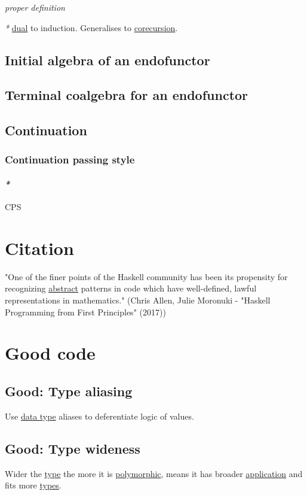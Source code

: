 \documentclass[a4paper,14pt,oneside]{book}
\begin{document}
\emph{proper definition}

\emph{*} \hyperref[org94a88e8]{dual} to induction.
Generalises to \hyperref[orgb09dacb]{corecursion}.

\chapter{\label{orgbb44056}Initial algebra of an endofunctor}
\label{sec:org2048a8b}
\chapter{\label{org3ceac6e}Terminal coalgebra for an endofunctor}
\label{sec:org812c932}
\chapter{Continuation}
\label{sec:org532e912}
\section{Continuation passing style}
\label{sec:org107167c}

\subsection{\emph{*}}
\label{sec:org6287ce2}

CPS

\part{Citation}
\label{sec:org19eb514}

"One of the finer points of the Haskell community has been its propensity for recognizing \hyperref[orgb20e98c]{abstract} patterns in code which have well-defined, lawful representations in mathematics." (Chris Allen, Julie Moronuki - "Haskell Programming from First Principles" (2017))

\part{Good code}
\label{sec:org19d29ca}
\chapter{\label{org0ce078f}Good: Type aliasing}
\label{sec:orga5e0619}
Use \hyperref[orgec53525]{data type} aliases to deferentiate logic of values.

\chapter{\label{org715aad1}Good: Type wideness}
\label{sec:org99bbc64}
Wider the \hyperref[org7c4e373]{type} the more it is \hyperref[org94d770c]{polymorphic}, means it has broader \hyperref[orgf219b59]{application} and fits more \hyperref[org5a18391]{types}.
\end{document}
